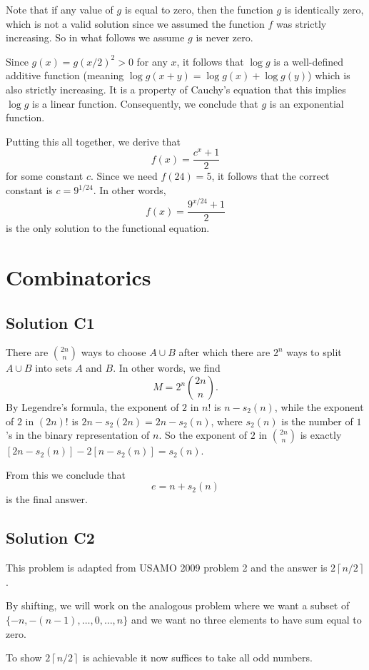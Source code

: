 \documentclass[11pt]{scrartcl}
\begin{document}
Note that if any value of $g$ is equal to zero, then the function $g$ is identically zero,
which is not a valid solution since we assumed the function $f$ was strictly increasing.
So in what follows we assume $g$ is never zero.

Since $g(x) = g(x/2)^2 > 0$ for any $x$,
it follows that $\log g$ is a well-defined additive function
(meaning $\log g(x+y) = \log g(x) + \log g(y)$)
which is also strictly increasing.
It is a property of Cauchy's equation that this implies $\log g$ is a linear function.
Consequently, we conclude that $g$ is an exponential function.

Putting this all together, we derive that
\[ f(x) = \frac{c^x+1}{2} \]
for some constant $c$.
Since we need $f(24) = 5$, it follows that the correct constant is $c = 9^{1/24}$.
In other  words,
\[ f(x) = \frac{9^{x/24} + 1}{2} \]
is the only solution to the functional equation.


\section{Combinatorics}
\subsection*{Solution C1}
There are $\binom{2n}{n}$ ways to choose $A \cup B$
after which there are $2^n$ ways to split $A \cup B$ into sets $A$ and $B$.
In other words, we find
\[ M = 2^n \binom{2n}{n}. \]
By Legendre's formula, the exponent of $2$ in $n!$ is $n - s_2(n)$,
while the exponent of $2$ in $(2n)!$ is $2n - s_2(2n) = 2n - s_2(n)$,
where $s_2(n)$ is the number of $1$'s in the binary representation of $n$.
So the exponent of $2$ in $\binom{2n}{n}$ is
exactly $[2n-s_2(n)] - 2[n-s_2(n)] = s_2(n)$.

From this we conclude that
\[ e = n + s_2(n) \]
is the final answer.

\subsection*{Solution C2}
This problem is adapted from USAMO 2009 problem 2
and the answer is $2 \left\lceil n/2 \right\rceil$.

By shifting, we will work on the analogous problem
where we want a subset of $\{-n, -(n-1), \dots, 0, \dots, n \}$
and we want no three elements to have sum equal to zero.

To show $2 \left\lceil n/2 \right\rceil$ is achievable
it now suffices to take all odd numbers.
\end{document}
